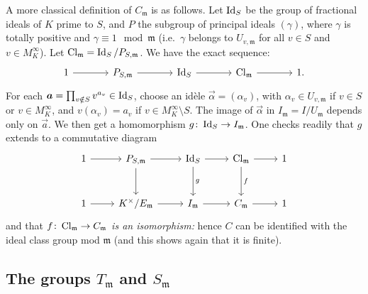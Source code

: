 \begin{obs}
A more classical definition of $C_{\mathfrak{m}}$ is as follows. Let $\operatorname{Id}_S$ be
the group of fractional ideals of $K$ prime to $S$, and $P$ the subgroup of
principal ideals $(\gamma)$, where $\gamma$ is totally positive and
\dpage
$\gamma \equiv 1 \mod{\mathfrak{m}}$ (i.e.\ $\gamma$ belongs to $U_{v,
\mathfrak{m}}$ for all $v \in S$ and $v \in M_K^\infty$). Let
$\operatorname{Cl}_{\mathfrak{m}} = \operatorname{Id}_S/P_{S, \mathfrak{m}}$. We have the exact sequence:
\[\begin{tikzcd}[sep=large]
	1 \rar & P_{S, \mathfrak{m}} \rar & \Id_S \rar & \Cl_{\mathfrak{m}}
	\rar & 1.
\end{tikzcd}\]
For each $\bm{a} = \prod_{v\notin S} v^{a_v} \in \operatorname{Id}_S$, choose an idèle
$\vec\alpha = (\alpha_v)$, with $\alpha_v \in U_{v, \mathfrak{m}}$ if $v \in S$
or $v \in M_K^\infty$, and $v(\alpha_v) = a_v$ if $v \in M_K^\infty \setminus
S$. The image of $\vec\alpha$ in $I_{\mathfrak{m}} = I/U_{\mathfrak{m}}$
depends only on $\vec a$. We then get a homomorphism $g \colon \operatorname{Id}_S \to
I_{\mathfrak{m}}$.
One checks readily that $g$ extends to a commutative diagram
\[\begin{tikzcd}[row sep=large]
	1 & P_{S, \mathfrak{m}} & \Id_S & \Cl_{\mathfrak{m}} & 1 \\
	1 & K^\times/E_{\mathfrak{m}} & I_{\mathfrak{m}} & C_{\mathfrak{m}} & 1
	\arrow[from=1-1, to=1-2]
	\arrow[from=1-2, to=1-3]
	\arrow[from=1-2, to=2-2]
	\arrow[from=1-3, to=1-4]
	\arrow["g", from=1-3, to=2-3]
	\arrow[from=1-4, to=1-5]
	\arrow["f", from=1-4, to=2-4]
	\arrow[from=2-1, to=2-2]
	\arrow[from=2-2, to=2-3]
	\arrow[from=2-3, to=2-4]
	\arrow[from=2-4, to=2-5]
\end{tikzcd}\]
and that $f\colon \operatorname{Cl}_{\mathfrak{m}} \to C_{\mathfrak{m}}$ \emph{is an
isomorphism:} hence $C$ can be identified with the ideal class group mod
$\mathfrak{m}$ (and this shows again that it is finite).
\end{obs}

\subsection{The groups \texorpdfstring{$T_{\mathfrak{m}}$}{Tm} and
\texorpdfstring{$S_{\mathfrak{m}}$}{Sm}}
\label{sec:II_22}

